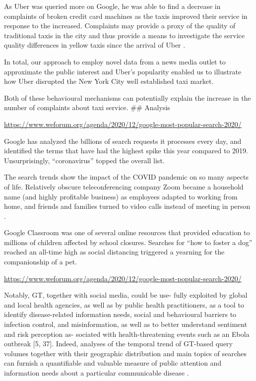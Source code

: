 \documentclass[11pt,a4paper,]{article}
\begin{document}
As Uber was queried more on Google, he was able to find a decrease in complaints of broken credit card machines as the taxis improved their service in response to the increased. Complaints may provide a proxy of the quality of traditional taxis in the city and thus provide a means to investigate the service quality differences in yellow taxis since the arrival of Uber \autocite{willis2020using}.

In total, our approach to employ novel data from a news media outlet to approximate the public interest and Uber's popularity enabled us to illustrate how Uber disrupted the New York City well established taxi market.

Both of these behavioural mechanisms can potentially explain the increase in the number of complaints about taxi service.
\#\# Analysis

\url{https://www.weforum.org/agenda/2020/12/google-most-popular-search-2020/}

Google has analyzed the billions of search requests it processes every day, and identified the terms that have had the highest spike this year compared to 2019. Unsurprisingly, ``coronavirus'' topped the overall list.

The search trends show the impact of the COVID pandemic on so many aspects of life. Relatively obscure teleconferencing company Zoom became a household name (and highly profitable business) as employees adapted to working from home, and friends and families turned to video calls instead of meeting in person .

Google Classroom was one of several online resources that provided education to millions of children affected by school closures. Searches for ``how to foster a dog'' reached an all-time high as social distancing triggered a yearning for the companionship of a pet.

\url{https://www.weforum.org/agenda/2020/12/google-most-popular-search-2020/}

Notably, GT, together with social media, could be use- fully exploited by global and local health agencies, as well as by public health practitioners, as a tool to identify disease-related information needs, social and behavioural barriers to infection control, and misinformation, as well as to better understand sentiment and risk perception as- sociated with health-threatening events such as an Ebola outbreak {[}5, 37{]}. Indeed, analyses of the temporal trend of GT-based query volumes together with their geographic distribution and main topics of searches can furnish a quantifiable and valuable measure of public attention and information needs about a particular communicable disease \autocite{alicino2015assessing}.
\end{document}
